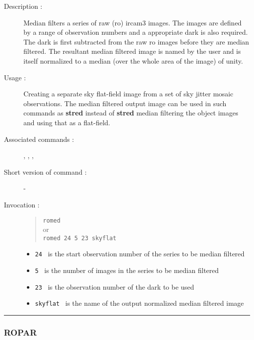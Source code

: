 \begin{description}

\item[Description :] Median filters a series of raw ({\sc ro}) {\sc
ircam3} images.  The images are defined by a range of observation
numbers and a appropriate dark is also required.  The dark is first
subtracted from the raw {\sc ro} images before they are median
filtered.  The resultant median filtered image is named by the user and
is itself normalized to a median (over the whole area of the image) of
unity.

\item[Usage :] Creating a separate
sky flat-field image from a set of sky jitter mosaic observations.  The
median filtered output image can be used in such commands as {\bf
stred} instead of {\bf stred} median filtering the object images and
using that as a flat-field.

\item[Associated commands :] {\tt {}},
{\tt {}}, {\tt {}},
{\tt {}}

\item[Short version of command :] -
\item[Invocation :]

\begin{quote}{\tt  romed }\\
or \\
{\tt romed 24 5 23 skyflat }
\end{quote}

\begin{itemize}

\item {\tt 24 } is the start observation number of the series to be
 median filtered
\item {\tt 5 } is the number of images in the series to be median
 filtered
\item {\tt 23 } is the observation number of the dark to be used
\item {\tt skyflat } is the name of the output normalized median
 filtered image
\end{itemize}

\end{description}

\hrule
\subsubsection*{\label{ROPAR}ROPAR}

